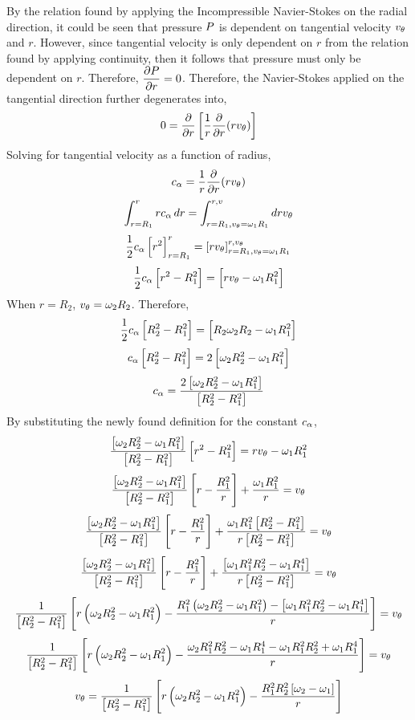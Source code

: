 \documentclass[class=report, 12pt, crop=false]{standalone}
\begin{document}
\begin{center}
By the relation found by applying the Incompressible Navier-Stokes on the radial direction, it could be seen that pressure $\displaystyle{P}$ is dependent on tangential velocity $v_\theta$ and $r$. However, since tangential velocity is only dependent on $r$ from the relation found by applying continuity, then it follows that pressure must only be dependent on $r$. Therefore, $\displaystyle{\frac{\partial P}{\partial r} = 0}$. Therefore, the Navier-Stokes applied on the tangential direction further degenerates into,
$$0 = \frac{\partial}{\partial r}\left[\frac{1}{r}\frac{\partial}{\partial r}(rv_\theta)\right]$$
Solving for tangential velocity as a function of radius,
$$c_\alpha = \frac{1}{r}\frac{\partial}{\partial r}(rv_\theta)$$
$$\int^{r}_{r=R_1}rc_\alpha\,dr = \int^{r,v}_{r=R_1,v_\theta = \omega_1R_1}drv_\theta$$
$$\frac{1}{2}c_\alpha\left[r^2\right]^{r}_{r=R_1} = \left[rv_\theta\right]^{r,v_\theta}_{r=R_1,v_\theta = \omega_1R_1}$$
$$\frac{1}{2}c_\alpha\left[r^2 - R_1^2\right] = \left[rv_\theta - \omega_1R_1^2\right]$$
When $r = R_2$, $v_\theta = \omega_2R_2$. Therefore,
$$\frac{1}{2}c_\alpha\left[R_2^2 - R_1^2\right] = \left[R_2\omega_2R_2 - \omega_1R_1^2\right]$$
$$c_\alpha\left[R_2^2 - R_1^2\right] = 2\left[\omega_2R_2^2 - \omega_1R_1^2\right]$$
$$c_\alpha = \frac{2\left[\omega_2R_2^2 - \omega_1R_1^2\right]}{\left[R_2^2 - R_1^2\right]}$$
By substituting the newly found definition for the constant $c_\alpha$,
$$\frac{\left[\omega_2R_2^2 - \omega_1R_1^2\right]}{\left[R_2^2 - R_1^2\right]}  \left[r^2 - R_1^2\right] = rv_\theta - \omega_1R_1^2$$
$$\frac{\left[\omega_2R_2^2 - \omega_1R_1^2\right]}{\left[R_2^2 - R_1^2\right]}  \left[r - \frac{R_1^2}{r}\right] + \frac{\omega_1R_1^2}{r} = v_\theta$$
$$\frac{\left[\omega_2R_2^2 - \omega_1R_1^2\right]}{\left[R_2^2 - R_1^2\right]}  \left[r - \frac{R_1^2}{r}\right] + \frac{\omega_1R_1^2\left[R_2^2 - R_1^2\right]}{r\left[R_2^2 - R_1^2\right]} = v_\theta$$
$$\frac{\left[\omega_2R_2^2 - \omega_1R_1^2\right]}{\left[R_2^2 - R_1^2\right]}  \left[r - \frac{R_1^2}{r}\right] + \frac{\left[\omega_1R_1^2R_2^2 - \omega_1R_1^4\right]}{r\left[R_2^2 - R_1^2\right]} = v_\theta$$
$$\frac{1}{\left[R_2^2 - R_1^2\right]}  \left[r\left(\omega_2R_2^2 - \omega_1R_1^2\right) - \frac{R_1^2\left(\omega_2R_2^2 - \omega_1R_1^2\right) - \left[\omega_1R_1^2R_2^2 - \omega_1R_1^4\right]}{r}\right] = v_\theta$$
$$\frac{1}{\left[R_2^2 - R_1^2\right]}  \left[r\left(\omega_2R_2^2 - \omega_1R_1^2\right) - \frac{\omega_2R_1^2R_2^2 - \omega_1R_1^4 - \omega_1R_1^2R_2^2 + \omega_1R_1^4}{r}\right] = v_\theta$$
$$v_\theta = \frac{1}{\left[R_2^2 - R_1^2\right]}  \left[r\left(\omega_2R_2^2 - \omega_1R_1^2\right) - \frac{R_1^2R_2^2\left[\omega_2 - \omega_1\right]}{r}\right]$$

\end{center}
\end{document}
